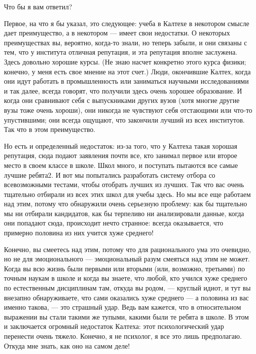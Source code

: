 \documentclass[11pt,oneside]{article}
\begin{document}
Что бы я вам ответил?\par

Первое, на что я бы указал, это следующее: учеба в Калтехе в некотором смысле дает преимущество, а в некотором --- имеет свои недостатки. О некоторых преимуществах вы, вероятно, когда-то знали, но теперь забыли, и они связаны с тем, что у института отличная репутация, и эта репутация вполне заслужена. Здесь довольно хорошие курсы. (Не знаю насчет конкретно этого курса физики; конечно, у меня есть свое мнение на этот счет.) Люди, окончившие Калтех, когда они идут работать в промышленность или заниматься научными исследованиями и так далее, всегда говорят, что получили здесь очень хорошее образование. И когда они сравнивают себя с выпускниками других вузов (хотя многие другие вузы тоже очень хороши), они никогда не чувствуют себя отстающими или что-то упустившими; они всегда ощущают, что закончили лучший из всех институтов. Так что в этом преимущество.\par

Но есть и определенный недостаток: из-за того, что у Калтеха такая хорошая репутация, сюда подают заявления почти все, кто занимал первое или второе место в своем классе в школе. Школ много, и поступать пытаются все самые лучшие ребята2. И вот мы попытались разработать систему отбора со всевозможными тестами, чтобы отобрать лучших из лучших. Так что вас очень тщательно отбирали из всех этих школ для учебы здесь. Но мы все еще работаем над этим, потому что обнаружили очень серьезную проблему: как бы тщательно мы ни отбирали кандидатов, как бы терпеливо ни анализировали данные, когда они попадают сюда, происходит нечто странное: всегда оказывается, что примерно половина из них учится хуже среднего!\par

Конечно, вы смеетесь над этим, потому что для рационального ума это очевидно, но не для эмоционального --- эмоциональный разум смеяться над этим не может. Когда вы всю жизнь были первыми или вторыми (или, возможно, третьими) по точным наукам в школе и когда вы знаете, что любой, кто учился хуже среднего по естественным дисциплинам там, откуда вы родом, --- круглый идиот, и тут вы внезапно обнаруживаете, что сами оказались хуже среднего --- а половина из вас именно такова, --- это страшный удар. Ведь вам кажется, что в относительном выражении вы стали такими же тупыми, какими были те ребята в школе. В этом и заключается огромный недостаток Калтеха: этот психологический удар перенести очень тяжело. Конечно, я не психолог, я все это лишь предполагаю. Откуда мне знать, как оно на самом деле!\par
\end{document}
